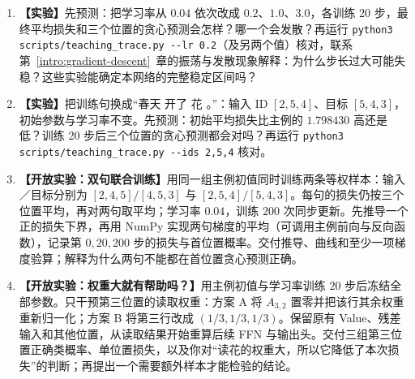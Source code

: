 \begin{enumerate}[label={},leftmargin=4.8em,itemsep=4pt]
\item[\textbf{C-082.}] \leavevmode{}\label{exercise:C-082}\label{exercise:training-rate-transfer}\textbf{【实验】}先预测：把学习率从 $0.04$ 依次改成 $0.2$、$1.0$、$3.0$，各训练 20 步，最终平均损失和三个位置的贪心预测会怎样？哪一个会发散？再运行 \texttt{python3 scripts/teaching\_trace.py -{}-lr 0.2}（及另两个值）核对，联系第~\ref*{intro:gradient-descent}~章的振荡与发散现象解释：为什么步长过大可能失稳？这些实验能确定本网络的完整稳定区间吗？
\item[\textbf{C-083.}] \leavevmode{}\label{exercise:C-083}\label{exercise:training-sentence-change}\textbf{【实验】}把训练句换成“春天 开了 花 。”：输入 ID $[2,5,4]$、目标 $[5,4,3]$，初始参数与学习率不变。先预测：初始平均损失比主例的 $1.798430$ 高还是低？训练 20 步后三个位置的贪心预测都会对吗？再运行 \texttt{python3 scripts/teaching\_trace.py -{}-ids 2,5,4} 核对。
\item[\textbf{C-084.}] \leavevmode{}\label{exercise:C-084}\label{exercise:joint-prefix-loss-floor}\textbf{【开放实验：双句联合训练】}用同一组主例初值同时训练两条等权样本：输入／目标分别为 $[2,4,5]/[4,5,3]$ 与 $[2,5,4]/[5,4,3]$。每句的损失仍按三个位置平均，再对两句取平均；学习率 $0.04$，训练 $200$ 次同步更新。先推导一个正的损失下界，再用 NumPy 实现两句梯度的平均（可调用主例前向与反向函数），记录第 $0,20,200$ 步的损失与首位置概率。交付推导、曲线和至少一项梯度验算；解释为什么两句不能都在首位置贪心预测正确。
\item[\textbf{C-085.}] \leavevmode{}\label{exercise:C-085}\label{exercise:attention-causal-intervention}\textbf{【开放实验：权重大就有帮助吗？】}用主例初值与学习率训练 $20$ 步后冻结全部参数。只干预第三位置的读取权重：方案 A 将 $A_{3,2}$ 置零并把该行其余权重重新归一化；方案 B 将第三行改成 $(1/3,1/3,1/3)$。保留原有 Value、残差输入和其他位置，从读取结果开始重算后续 FFN 与输出头。交付三组第三位置正确类概率、单位置损失，以及你对“读花的权重大，所以它降低了本次损失”的判断；再提出一个需要额外样本才能检验的结论。
\end{enumerate}
